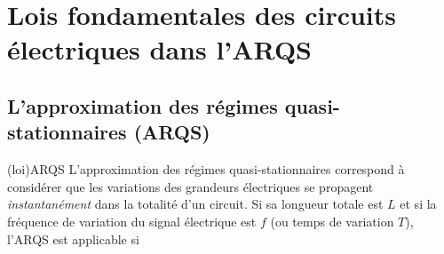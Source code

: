 \documentclass[../../main/main.tex]{subfiles}
\begin{document}
\begin{tcb*}[label=prop:mesure, sidebyside, righthand ratio=.4]
\begin{center}
{		}%
	\end{center}
	\begin{center}
	\end{center}
\end{tcb*}

\section{Lois fondamentales des circuits électriques dans l'ARQS}

\subsection{L'approximation des régimes quasi-stationnaires (ARQS)}

\begin{tcb*}[sidebyside, lefthand ratio=.60](loi){ARQS}
	L'approximation des régimes quasi-stationnaires correspond à considérer
	que les variations des grandeurs électriques se propagent
	\textit{instantanément} dans la totalité d'un circuit. Si sa longueur
	totale est $L$ et si la fréquence de variation du signal électrique est
	$f$ (ou temps de variation $T$), l'ARQS est applicable si
	\tcblower
\end{tcb*}
\end{document}
